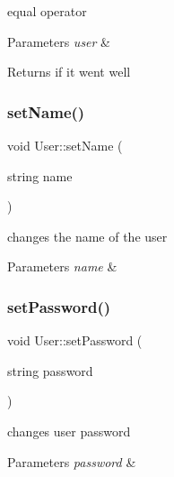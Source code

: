 equal operator 


\begin{DoxyParams}{Parameters}
{\em user} & \\
\hline
\end{DoxyParams}
\begin{DoxyReturn}{Returns}
if it went well 
\end{DoxyReturn}
\hypertarget{class_user_acabf7e5a40909656de5bc631abe5588c}{}\label{class_user_acabf7e5a40909656de5bc631abe5588c} 
\subsubsection{\texorpdfstring{set\+Name()}{setName()}}
{\footnotesize\ttfamily void User\+::set\+Name (\begin{DoxyParamCaption}\item[{string}]{name }\end{DoxyParamCaption})\hspace{0.3cm}{\ttfamily [inline]}}



changes the name of the user 


\begin{DoxyParams}{Parameters}
{\em name} & \\
\hline
\end{DoxyParams}
\hypertarget{class_user_ab9645a2f4dc87343f9e9aeb408be41ad}{}\label{class_user_ab9645a2f4dc87343f9e9aeb408be41ad} 
\subsubsection{\texorpdfstring{set\+Password()}{setPassword()}}
{\footnotesize\ttfamily void User\+::set\+Password (\begin{DoxyParamCaption}\item[{string}]{password }\end{DoxyParamCaption})\hspace{0.3cm}{\ttfamily [inline]}}



changes user password 


\begin{DoxyParams}{Parameters}
{\em password} & \\
\hline
\end{DoxyParams}
\hypertarget{class_user_a0fed77d10cd142ee4112d650ec564e6b}{}\label{class_user_a0fed77d10cd142ee4112d650ec564e6b} 

